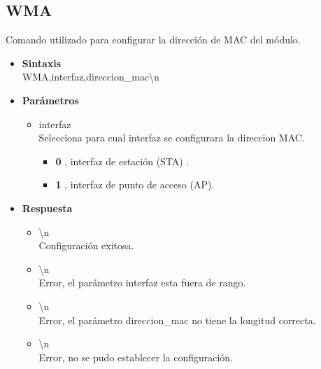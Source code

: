 \documentclass[a4paper,spanish]{article}
\begin{document}
\subsection{WMA}
Comando utilizado para configurar la dirección de MAC del módulo. 
\begin{itemize}
	\item \textbf{Sintaxis}\\
	{\ttfamily WMA,interfaz,direccion\_mac\textbackslash n}
	\item \textbf{Parámetros}\\
	\begin{itemize}
		\item{\ttfamily interfaz}\\
		Selecciona para cual interfaz se configurara la direccion MAC.
		\begin{itemize}
			\item \textbf{0} , interfaz de estación (STA) . 
			\item \textbf{1} , interfaz de punto de acceso (AP).
		\end{itemize}
	\end{itemize}
	\item \textbf{Respuesta}
	\begin{itemize}
		\item{\textbackslash n} \\
		Configuración exitosa.
		\item{\textbackslash n} \\
		Error, el parámetro {\ttfamily interfaz} esta fuera de rango.
		\item{\textbackslash n} \\
		Error, el parámetro {\ttfamily direccion\_mac} no tiene la longitud correcta.
		\item{\textbackslash n} \\
		Error, no se pudo establecer la configuración.
	\end{itemize}
\end{itemize}
\end{document}
